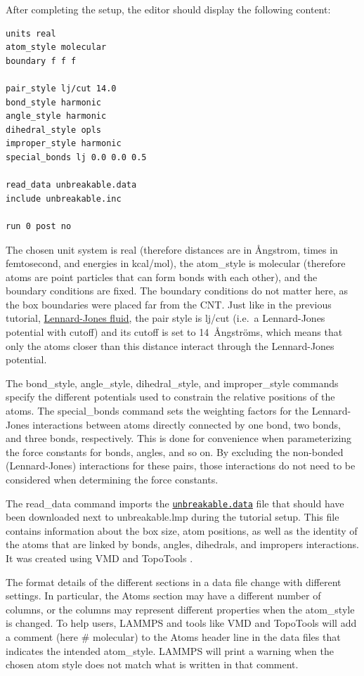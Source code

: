 \documentclass[9pt,tutorial]{livecoms}
\newcommand{\lmpcmd}[1]{\hspace{0pt}\colorbox{listing}{\textcolor{command}{\small{#1}}}\hspace{0pt}} %
\newcommand{\dwlcmd}[1]{\textcolor{download}{\texttt{#1}}} %
\newcommand{\filepath}{https://raw.githubusercontent.com/lammpstutorials/lammpstutorials-article/main/files/}
\begin{document}
After completing the setup, the editor should display the following content:
\begin{lstlisting}
units real
atom_style molecular
boundary f f f

pair_style lj/cut 14.0
bond_style harmonic
angle_style harmonic
dihedral_style opls
improper_style harmonic
special_bonds lj 0.0 0.0 0.5

read_data unbreakable.data
include unbreakable.inc

run 0 post no
\end{lstlisting}
The chosen unit system is \lmpcmd{real} (therefore distances are in
Ångstrom, times in femtosecond, and energies in kcal/mol), the
\lmpcmd{atom\_style} is \lmpcmd{molecular} (therefore atoms are point particles
that can form bonds with each other), and the boundary conditions are
fixed.  The boundary conditions do not matter here, as the box
boundaries were placed far from the CNT.  Just like in the previous
tutorial, \hyperref[lennard-jones-label]{Lennard-Jones fluid}, the pair
style is \lmpcmd{lj/cut} (i.e.~a Lennard-Jones potential with cutoff)
and its cutoff is set to 14~Ångströms, which means that only the atoms
closer than this distance interact through the Lennard-Jones potential.

The \lmpcmd{bond\_style}, \lmpcmd{angle\_style},
\lmpcmd{dihedral\_style}, and \lmpcmd{improper\_style} commands specify
the different potentials used to constrain the relative positions of the
atoms.  The \lmpcmd{special\_bonds} command sets the weighting factors
for the Lennard-Jones interactions between atoms directly connected by
one bond, two bonds, and three bonds, respectively.  This is done for
convenience when parameterizing the force constants for bonds, angles, and
so on.  By excluding the non-bonded (Lennard-Jones) interactions for
these pairs, those interactions do not need to be considered when determining
the force constants.

The \lmpcmd{read\_data} command imports the
\href{\filepath tutorial2/unbreakable.data}{\dwlcmd{unbreakable.data}}
file that should have been downloaded next
to \lmpcmd{unbreakable.lmp} during the tutorial setup. This file
contains information about the box size, atom positions, as well as the
identity of the atoms that are
linked by \lmpcmd{bonds}, \lmpcmd{angles}, \lmpcmd{dihedrals}, and
\lmpcmd{impropers} interactions. It was created using VMD and TopoTools
\cite{kohlmeyer2017topotools}.

\begin{note}
The format details of the
different sections in a data file change with different settings.  In
particular, the \lmpcmd{Atoms} section may have a different number of
columns, or the columns may represent different properties when the
\lmpcmd{atom\_style} is changed.  To help users, LAMMPS and tools like
VMD and TopoTools will add a comment (here \lmpcmd{\# molecular}) to the
\lmpcmd{Atoms} header line in the data files that indicates the intended
\lmpcmd{atom\_style}.  LAMMPS will print a warning when the chosen atom
style does not match what is written in that comment.
\end{note}
\end{document}
